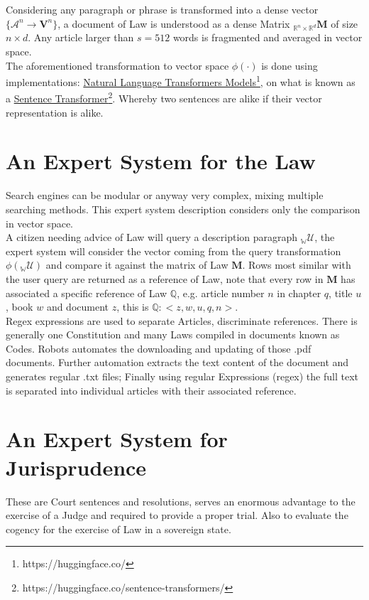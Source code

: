 \documentclass[a4paper,fleqn]{cas-sc}
\begin{document}
\noindent
Considering any paragraph or phrase is transformed into a dense vector $\{\mathcal{A}^{n} \rightarrow \mathbf{V}^{n}\}$, 
a document of Law is understood as a dense Matrix ${}_{\mathbb{R}^{n}\times\mathbb{R}^{d}}{\mathbf{M}}$ of size $n\times{d}$. 
Any article larger than $s=512$ words is fragmented and averaged in vector space. \\
\noindent
The aforementioned transformation to vector space $\phi{}(\cdot{})$ is done using \cite{https://doi.org/10.48550/arxiv.1706.03762} implementations: 
\href{https://huggingface.co/}{Natural Language Transformers Models}\footnote{https://huggingface.co/}, on what is known as a 
\href{https://huggingface.co/sentence-transformers/}{Sentence Transformer}\footnote{https://huggingface.co/sentence-transformers/}. 
Whereby two sentences are alike if their vector representation is alike. 


\section{An Expert System for the Law}
Search engines can be modular or anyway very complex, mixing multiple searching methods. 
This expert system description considers only the comparison in vector space. \\
\noindent
A citizen needing advice of Law will query a description paragraph ${}_{\mathbb{W}}\mathcal{U}$, 
the expert system will consider the vector coming from the query transformation $\phi({}_{\mathbb{W}}\mathcal{U})$ 
and compare it against the matrix of Law $\mathbf{M}$. 
Rows most similar with the user query are returned as a reference of Law, note that every row in $\mathbf{M}$ 
has associated a specific reference of Law $\mathbb{Q}$, 
e.g. article number $n$ in chapter $q$, title $u$, book $w$ and document $z$, this is $\mathbb{Q}:<z,w,u,q,n>$.\\

\noindent
Regex expressions are used to separate Articles, discriminate references. 
There is generally one Constitution and many Laws compiled in documents known as Codes. 
Robots automates the downloading and updating of those .pdf documents. 
Further automation extracts the text content of the document and generates regular .txt files; 
Finally using regular Expressions (regex) the full text is separated into individual articles with their associated reference. 

\section{An Expert System for Jurisprudence}
These are Court sentences and resolutions, serves an enormous advantage to the exercise of a Judge and required to provide a 
proper trial. Also to evaluate the cogency for the exercise of Law in a sovereign state. \\
\end{document}
